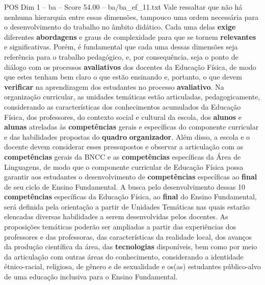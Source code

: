 \begin{textsample}{POS Dim 1 – ba – Score 54.00 – ba/ba\_ef\_11.txt}
Vale ressaltar que não há nenhuma hierarquia entre essas dimensões, tampouco uma ordem necessária para o desenvolvimento do trabalho no âmbito didático.
Cada uma delas \textbf{exige} diferentes \textbf{abordagens} e graus de complexidade para que se tornem \textbf{relevantes} e significativas.
Porém, é fundamental que cada uma dessas dimensões seja referência para o trabalho pedagógico, e, por consequência, seja o ponto de diálogo com os processos \textbf{avaliativos} dos docentes da Educação Física, de modo que estes tenham bem claro o que estão ensinando e, portanto, o que devem \textbf{verificar} na aprendizagem dos estudantes no processo \textbf{avaliativo}.
Na organização curricular, as unidades temáticas estão articuladas, pedagogicamente, considerando as características dos conhecimentos acumulados da Educação Física, dos professores, do contexto social e cultural da escola, dos \textbf{alunos} e \textbf{alunas} atreladas às \textbf{competências} gerais e específicas do componente curricular e das habilidades propostas do \textbf{quadro} \textbf{organizador}.
Além disso, a escola e o docente devem considerar esses pressupostos e observar a articulação com as \textbf{competências} gerais da BNCC e as \textbf{competências} específicas da Área de Linguagens, de modo que o componente curricular de Educação Física possa garantir aos estudantes o desenvolvimento de \textbf{competências} específicas ao \textbf{final} de seu ciclo de Ensino Fundamental.
A busca pelo desenvolvimento dessas 10 \textbf{competências} específicas da Educação Física, ao \textbf{final} do Ensino Fundamental, será definida pela orientação a partir de Unidades Temáticas nas quais estarão elencadas diversas habilidades a serem desenvolvidas pelos docentes.
As proposições temáticas poderão ser ampliadas a partir das experiências dos professores e das professoras, das características da realidade local, dos avanços da produção científica da área, das \textbf{tecnologias} disponíveis, bem como por meio da articulação com outras áreas do conhecimento, considerando a identidade étnico-racial, religiosa, de gênero e de sexualidade e os(as) estudantes público-alvo de uma educação inclusiva para o Ensino Fundamental.

\end{textsample}
